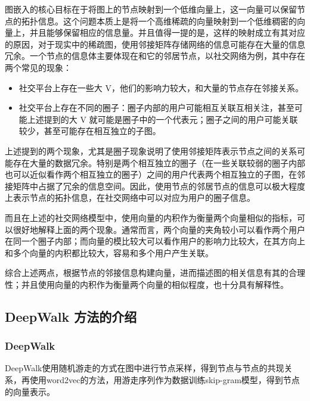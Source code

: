 \documentclass{ctexart}
\begin{document}
图嵌入的核心目标在于将图上的节点映射到一个低维向量上，这一向量可以保留节点的拓扑信息。这个问题本质上是将一个高维稀疏的向量映射到一个低维稠密的向量上，并且能够保留相应的信息量。并且值得一提的是，这样的映射成立有其对应的原因，对于现实中的稀疏图，使用邻接矩阵存储网络的信息可能存在大量的信息冗余。一个节点的信息体主要体现在和它的邻居节点，以社交网络为例，其中存在两个常见的现象：

\begin{itemize}
    \item 社交平台上存在一些大 V，他们的影响力较大，和大量的节点存在邻接关系。
    \item 社交平台上存在不同的圈子：圈子内部的用户可能相互关联互相关注，甚至可能上述提到的大 V 就可能是圈子中的一个代表元；圈子之间的用户可能关联较少，甚至可能存在相互独立的子图。
\end{itemize}

上述提到的两个现象，尤其是圈子现象说明了使用邻接矩阵表示节点之间的关系可能存在大量的数据冗余。特别是两个相互独立的圈子（在一些关联较弱的圈子内部也可以近似看作两个相互独立的圈子）之间的用户代表两个相互独立的子图，在邻接矩阵中占据了冗余的信息空间。因此，使用节点的邻居节点的信息可以极大程度上表示节点的拓扑信息，在社交网络中可以对应为用户的圈子信息。

而且在上述的社交网络模型中，使用向量的内积作为衡量两个向量相似的指标，可以很好地解释上面的两个现象。通常而言，两个向量的夹角较小可以看作两个用户在同一个圈子内部；而向量的模比较大可以看作用户的影响力比较大，在其方向上和多个向量的内积都比较大，容易和多个用户产生关联。

综合上述两点，根据节点的邻接信息构建向量，进而描述图的相关信息有其的合理性；并且使用向量的内积作为衡量两个向量的相似程度，也十分具有解释性。

\subsection{DeepWalk 方法的介绍}



\subsubsection{DeepWalk}

DeepWalk使用随机游走的方式在图中进行节点采样，得到节点与节点的共现关系，再使用word2vec的方法，用游走序列作为数据训练skip-gram模型，得到节点的向量表示。
\end{document}
